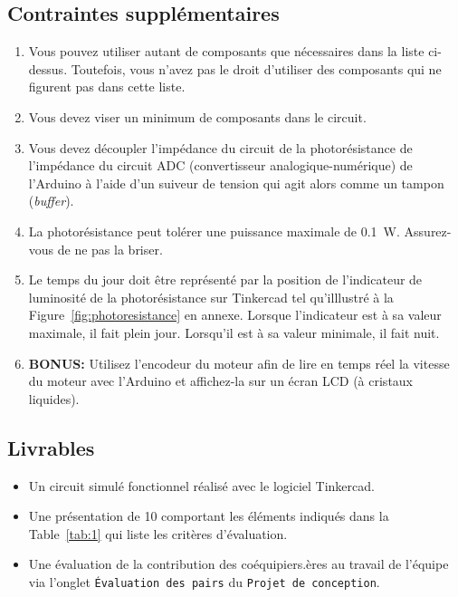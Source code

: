 \documentclass[english,french,12pt]{article}
\begin{document}
\subsection*{Contraintes supplémentaires}
\begin{enumerate}
    \item Vous pouvez utiliser autant de composants que nécessaires dans la liste ci-dessus. Toutefois, vous n’avez pas le droit d’utiliser des composants qui ne figurent pas dans cette liste.
    \item Vous devez viser un minimum de composants dans le circuit.
    \item Vous devez découpler l’impédance du circuit de la photorésistance de l’impédance du circuit ADC (convertisseur analogique-numérique) de l’Arduino à l'aide d'un suiveur de tension qui agit alors comme un tampon (\textit{buffer}).
    \item La photorésistance peut tolérer une puissance maximale de \SI{0.1}{W}. Assurez-vous de ne pas la briser.
    \item Le temps du jour doit être représenté par la position de l’indicateur de luminosité de la photorésistance sur Tinkercad tel qu'illlustré à la Figure~\ref{fig:photoresistance} en annexe. Lorsque l’indicateur est à sa valeur maximale, il fait plein jour. Lorsqu’il est à sa valeur minimale, il fait nuit.
    \item \textbf{BONUS:} Utilisez l’encodeur du moteur afin de lire en temps réel la vitesse du moteur avec l’Arduino et affichez-la sur un écran LCD (à cristaux liquides).%
\end{enumerate}
\vspace{-1em}

\subsection*{Livrables}
\begin{itemize}
    \item Un circuit simulé fonctionnel réalisé avec le logiciel Tinkercad.
    \item Une présentation de \SI{10}{\min} comportant les éléments indiqués dans la Table~\ref{tab:1} qui liste les critères d'évaluation.
    \item Une évaluation de la contribution des coéquipiers.ères au travail de l'équipe via l'onglet \texttt{Évaluation des pairs} du \texttt{Projet de conception}.
\end{itemize}
\vspace{-1em}
\end{document}
